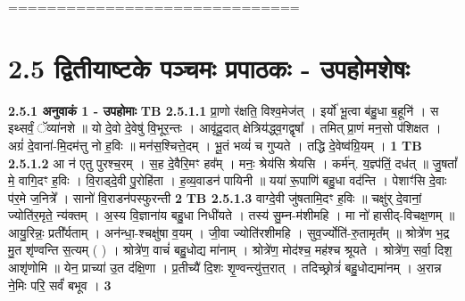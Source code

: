 \documentclass[17pt]{extarticle}
\begin{document}
============================== \newline
        \pagebreak
        
        
        
     \section*{ 2.5     द्वितीयाष्टके पञ्चमः प्रपाठकः - उपहोमशेषः }
                \textbf{ 2.5.1     अनुवाकं   1 -  उपहोमाः} \newline
                                \textbf{ TB 2.5.1.1} \newline
                  प्रा॒णो र॑क्षति॒ विश्व॒मेज॑त् । इर्यो॑ भू॒त्वा ब॑हु॒धा ब॒हूनि॑ । स इथ्सर्वं॒ ॅव्या॑नशे ॥ यो दे॒वो दे॒वेषु॑ वि॒भूर॒न्तः । आवृ॑दू॒दात् क्षेत्रिय॑द्ध्व॒गद्वृषा᳚ । तमित् प्रा॒णं मन॒सो प॑शिक्षत । अग्रं॑ दे॒वाना॑-मि॒दम॑त्तु नो ह॒विः ॥ मन॑स॒श्चित्ते॒दम् । भू॒तं भव्यं॑ च गुप्यते । तद्धि दे॒वेष्व॑ग्रि॒यम् । \textbf{ 1} \newline
                  \newline
                                \textbf{ TB 2.5.1.2} \newline
                  आ न॑ एतु पुरश्च॒रम् । स॒ह दे॒वैरि॒मꣳ हव᳚म् । मनः॒ श्रेय॑सि श्रेयसि । कर्म॑न्. य॒ज्ञ्प॑तिं॒ दध॑त् ॥ जु॒षतां᳚ मे॒ वागि॒दꣳ ह॒विः । वि॒राड्दे॒वी पु॒रोहि॑ता । ह॒व्य॒वाडन॑ पायिनी ॥ यया॑ रू॒पाणि॑ बहु॒धा वद॑न्ति । पेशाꣳ॑सि दे॒वाः प॑र॒मे ज॒नित्रे᳚ । सानो॑ वि॒राडन॑पस्फुरन्ती \textbf{ 2} \newline
                  \newline
                                \textbf{ TB 2.5.1.3} \newline
                  वाग्दे॒वी जु॑षतामि॒दꣳ ह॒विः ॥ चक्षु॑र् दे॒वानां॒ ज्योति॑र॒मृते॒ न्य॑क्तम् । अ॒स्य वि॒ज्ञाना॑य बहु॒धा निधी॑यते । तस्य॑ सु॒म्न-म॑शीमहि । मा नो॑ हासीद्-विचक्ष॒णम् ॥ आयु॒रिन्नः॒ प्रती᳚र्यताम् । अन॑न्धा॒-श्चक्षु॑षा व॒यम् । जी॒वा ज्योति॑रशीमहि । सुव॒र्ज्योति॑-रु॒तामृत᳚म् ॥ श्रोत्रे॑ण भ॒द्र मु॒त शृ॑ण्वन्ति स॒त्यम् ( ) ।  श्रोत्रे॑ण॒ वाचं॑ बहु॒धोद्य मा॑नाम् । श्रोत्रे॑ण॒ मोद॑श्च॒ मह॑श्च श्रूयते । श्रोत्रे॑ण॒ सर्वा॒ दिश॒ आशृ॑णोमि ॥ येन॒ प्राच्या॑ उ॒त द॑क्षि॒णा । प्र॒तीच्यै॑ दि॒शः शृ॒ण्वन्त्यु॑त्त॒रात् । तदिच्छ्रोत्रं॑ बहु॒धोद्यमा॑नम् । अ॒रान्न ने॒मिः परि॒ सर्वं॑ बभूव । \textbf{ 3} \newline
                  \newline
\end{document}
